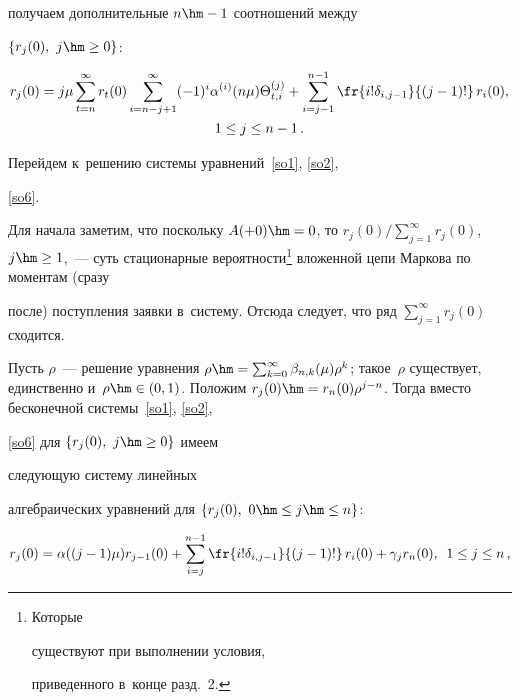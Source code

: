 получаем дополнительные $n\hm-1$ соотношений между

$\{r_j(0), \ j \hm\ge 0 \}$:

\begin{multline}

r_{j}(0) =j\mu \sum\limits_{t=n}^{\infty}

r_{t}(0) \sum\limits_{i=n-j+1}^{\infty} (-1)^i

\alpha^{(i)}(n \mu) \Theta^{(j)}_{t,i}

+ \sum\limits_{i=j-1}^{n-1} \fr{i! \delta_{i,j-1}}{(j-1)!}\, r_i(0), \\

 1\le j \le n-1\,.

\label{so6}

\end{multline}

Перейдем к~решению системы уравнений~\eqref{so1}, \eqref{so2}, 

\eqref{so6}.

Для начала заметим, что поскольку $A(+0)\hm=0$, то $r_j(0)/\sum\nolimits_{j=1}^\infty 

r_j(0)$, $j \hm\ge 1$,~--- суть стационарные вероятности\footnote[2]{Которые 

существуют при выполнении условия,

приведенного в~конце разд.~2.} вложенной цепи Маркова по моментам (сразу 

после) поступления заявки в~сис\-те\-му. Отсюда следует, что ряд ${\sum\nolimits_{j=1}^\infty 

r_j(0)}$ сходится. 



Пусть $\rho$~--- решение уравнения $\rho \hm=\sum\nolimits_{k=0}^{\infty}  

\beta_{n,k}(\mu) \rho^{k}$; такое~$\rho$ существует, единственно и~${\rho \hm\in 

(0,1)}$. Положим $r_j(0)\hm=r_{n}(0)\rho^{j-n}$. Тогда вместо бесконечной системы~\eqref{so1}, \eqref{so2}, 

\eqref{so6} для $\{r_j(0), \ j \hm\ge 0 \}$ имеем 

следующую систему линейных

алгебраических уравнений для $\{r_j(0), \ 0 \hm\le j \hm\le n \}$:

\begin{equation}

 \label{nor0}

r_{j}(0)=\alpha((j-1)\mu)r_{j-1}(0)

+\sum\limits_{i=j}^{n-1}\fr{i! \delta_{i,j-1}}{(j-1)!} \, r_i(0)

+\gamma_j r_{n}(0),\enskip 1\le j \le n\,,

\end{equation}

